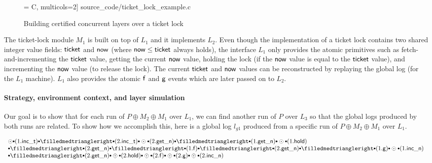 \begin{figure}
 = C, multicols=2] {source_code/ticket_lock_example.c}
\caption{Building certified concurrent layers over a ticket lock}
\label{fig:exp:ticket_lock_example}
\vspace{-10pt}
\end{figure}

The ticket-lock module $M_1$ is built on top of $L_1$ and it
implements $L_2$. Even though the implementation of a ticket lock
contains two shared integer value fields: $\mathsf{ticket}$ and
$\mathsf{now}$ (where $\mathsf{now} \leq \mathsf{ticket}$ always holds), the
interface $L_1$ only provides the atomic primitives such as
fetch-and-incrementing the $\mathsf{ticket}$ value, getting the current
$\mathsf{now}$ value, holding the lock (if the $\mathsf{now}$ value is
equal to the $\mathsf{ticket}$ value), and incrementing the $\mathsf{now}$
value (to release the lock). The current $\mathsf{ticket}$ and
$\mathsf{now}$ values can be reconstructed by replaying the global log
(for the $L_1$ machine).  $L_1$ also provides the atomic $\mathsf{f}$
and $\mathsf{g}$ events which are later passed on to $L_2$.

\paragraph{Strategy, environment context, and layer simulation}
Our goal is to show that for each run of $P\oplus{}M_2\oplus{}M_1$
over $L_1$, we can find another run of $P$ over $L_3$ so that the
global logs produced by both runs are related.
To show how we accomplish this, here is
a global log $l_{g1}$ produced from  
a specific run of $P\oplus{}M_2\oplus{}M_1$ over $L_1$.

\vspace*{-1ex}
\begin{small}
\[
\begin{array}{l}
\ssame \cons (1.\incticket) \cons
\sdiff \cons (2.\incticket) \cons
\ssame \cons (2.\getnow) \cons
\sdiff \cons (1.\getnow) \cons
\ssame \cons (1.\holdlock) 
\\
\cons 
\sdiff \cons (2.\getnow) \cons
\sdiff \cons (1.\comm{f}) \cons
\sdiff \cons (2.\getnow) \cons
\sdiff \cons (1.\comm{g}) \cons
\ssame \cons (1.\incnow) 
\\
\cons \sdiff \cons (2.\getnow) \cons
\ssame \cons (2.\holdlock) \cons
\ssame \cons (2.\comm{f}) \cons
\ssame \cons (2.\comm{g}) \cons
\ssame \cons (2.\incnow) 
\end{array}
\]
\end{small}%

